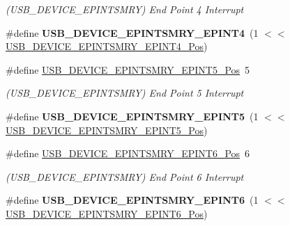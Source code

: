 \begin{DoxyCompactItemize}
\begin{DoxyCompactList}\small\item\em (U\+S\+B\+\_\+\+D\+E\+V\+I\+C\+E\+\_\+\+E\+P\+I\+N\+T\+S\+M\+R\+Y) End Point 4 Interrupt \end{DoxyCompactList}\item 
\hypertarget{group___s_a_m_l21___u_s_b_ga0264b8d94c6fd26e73a8dd468b2d57ab}{}\#define {\bfseries U\+S\+B\+\_\+\+D\+E\+V\+I\+C\+E\+\_\+\+E\+P\+I\+N\+T\+S\+M\+R\+Y\+\_\+\+E\+P\+I\+N\+T4}~(1 $<$$<$ \hyperlink{group___s_a_m_l21___u_s_b_gacd65c192a664ec0c792e39cf4a1d0364}{U\+S\+B\+\_\+\+D\+E\+V\+I\+C\+E\+\_\+\+E\+P\+I\+N\+T\+S\+M\+R\+Y\+\_\+\+E\+P\+I\+N\+T4\+\_\+\+Pos})\label{group___s_a_m_l21___u_s_b_ga0264b8d94c6fd26e73a8dd468b2d57ab}

\item 
\hypertarget{group___s_a_m_l21___u_s_b_ga8adb1e5204fe7eb1de4e44c263e9a80b}{}\#define \hyperlink{group___s_a_m_l21___u_s_b_ga8adb1e5204fe7eb1de4e44c263e9a80b}{U\+S\+B\+\_\+\+D\+E\+V\+I\+C\+E\+\_\+\+E\+P\+I\+N\+T\+S\+M\+R\+Y\+\_\+\+E\+P\+I\+N\+T5\+\_\+\+Pos}~5\label{group___s_a_m_l21___u_s_b_ga8adb1e5204fe7eb1de4e44c263e9a80b}

\begin{DoxyCompactList}\small\item\em (U\+S\+B\+\_\+\+D\+E\+V\+I\+C\+E\+\_\+\+E\+P\+I\+N\+T\+S\+M\+R\+Y) End Point 5 Interrupt \end{DoxyCompactList}\item 
\hypertarget{group___s_a_m_l21___u_s_b_gaac4de554659f813baa1cc0aa405d28a7}{}\#define {\bfseries U\+S\+B\+\_\+\+D\+E\+V\+I\+C\+E\+\_\+\+E\+P\+I\+N\+T\+S\+M\+R\+Y\+\_\+\+E\+P\+I\+N\+T5}~(1 $<$$<$ \hyperlink{group___s_a_m_l21___u_s_b_ga8adb1e5204fe7eb1de4e44c263e9a80b}{U\+S\+B\+\_\+\+D\+E\+V\+I\+C\+E\+\_\+\+E\+P\+I\+N\+T\+S\+M\+R\+Y\+\_\+\+E\+P\+I\+N\+T5\+\_\+\+Pos})\label{group___s_a_m_l21___u_s_b_gaac4de554659f813baa1cc0aa405d28a7}

\item 
\hypertarget{group___s_a_m_l21___u_s_b_ga7bf4a0fb814bbdcfd8d7ade3d73c3deb}{}\#define \hyperlink{group___s_a_m_l21___u_s_b_ga7bf4a0fb814bbdcfd8d7ade3d73c3deb}{U\+S\+B\+\_\+\+D\+E\+V\+I\+C\+E\+\_\+\+E\+P\+I\+N\+T\+S\+M\+R\+Y\+\_\+\+E\+P\+I\+N\+T6\+\_\+\+Pos}~6\label{group___s_a_m_l21___u_s_b_ga7bf4a0fb814bbdcfd8d7ade3d73c3deb}

\begin{DoxyCompactList}\small\item\em (U\+S\+B\+\_\+\+D\+E\+V\+I\+C\+E\+\_\+\+E\+P\+I\+N\+T\+S\+M\+R\+Y) End Point 6 Interrupt \end{DoxyCompactList}\item 
\hypertarget{group___s_a_m_l21___u_s_b_ga7a9c83b94184dfd4a21962e52478f288}{}\#define {\bfseries U\+S\+B\+\_\+\+D\+E\+V\+I\+C\+E\+\_\+\+E\+P\+I\+N\+T\+S\+M\+R\+Y\+\_\+\+E\+P\+I\+N\+T6}~(1 $<$$<$ \hyperlink{group___s_a_m_l21___u_s_b_ga7bf4a0fb814bbdcfd8d7ade3d73c3deb}{U\+S\+B\+\_\+\+D\+E\+V\+I\+C\+E\+\_\+\+E\+P\+I\+N\+T\+S\+M\+R\+Y\+\_\+\+E\+P\+I\+N\+T6\+\_\+\+Pos})\label{group___s_a_m_l21___u_s_b_ga7a9c83b94184dfd4a21962e52478f288}


\end{DoxyCompactItemize}
